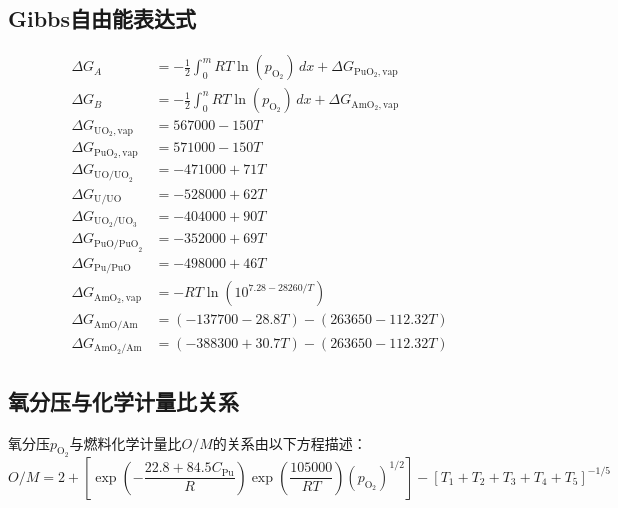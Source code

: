 \subsection{Gibbs自由能表达式}
\begin{equation}
\begin{aligned}
	\Delta G_A &= -\frac{1}{2} \int_0^m RT \ln(p_{\text{O}_2}) \, dx + \Delta G_{\text{PuO}_2,\text{vap}} \\
	\Delta G_B &= -\frac{1}{2} \int_0^n RT \ln(p_{\text{O}_2}) \, dx + \Delta G_{\text{AmO}_2,\text{vap}} \\
	\Delta G_{\text{UO}_2,\text{vap}} &= 567000 - 150T \\
	\Delta G_{\text{PuO}_2,\text{vap}} &= 571000 - 150T \\
	\Delta G_{\text{UO/UO}_2} &= -471000 + 71T \\
	\Delta G_{\text{U/UO}} &= -528000 + 62T \\
	\Delta G_{\text{UO}_2/\text{UO}_3} &= -404000 + 90T \\
	\Delta G_{\text{PuO/PuO}_2} &= -352000 + 69T \\
	\Delta G_{\text{Pu/PuO}} &= -498000 + 46T \\
	\Delta G_{\text{AmO}_2,\text{vap}} &= -R T \ln(10^{7.28 - 28260/T}) \\
	\Delta G_{\text{AmO/Am}} &= (-137700 - 28.8T) - (263650 - 112.32T) \\
	\Delta G_{\text{AmO}_2/\text{Am}} &= (-388300 + 30.7T) - (263650 - 112.32T)
\end{aligned}
\label{eq:app_b_rand_markin_gibbs_relations}
\end{equation}

\subsection{氧分压与化学计量比关系}
氧分压$p_{\text{O}_2}$与燃料化学计量比$O/M$的关系由以下方程描述：
\begin{equation}
O/M = 2 + \left[ \exp\left( -\frac{22.8 + 84.5 C_{\text{Pu}}}{R} \right) \exp\left( \frac{105000}{RT} \right) (p_{\text{O}_2})^{1/2} \right] - \left[ {T_1 + T_2 + T_3 + T_4 + T_5} \right]^{-1/5}
\label{eq:app_b_oxygen_pressure_stoichiometry}
\end{equation}

